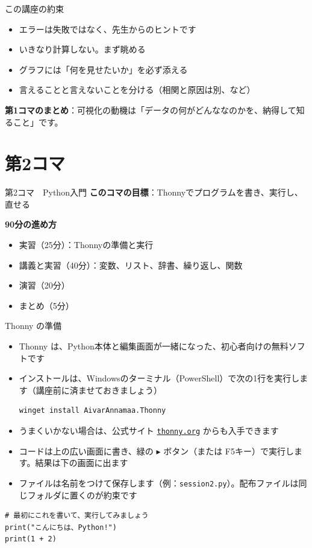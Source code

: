 \documentclass[aspectratio=169,11pt]{beamer}
\newcommand{\sess}[3]{%
\begin{frame}{#1}
\textbf{このコマの目標}：#2

\vspace{0.6em}
\textbf{90分の進め方}
\begin{itemize}
#3
\end{itemize}
\end{frame}}
\begin{document}
\begin{frame}{この講座の約束}
\begin{itemize}
\item エラーは失敗ではなく、先生からのヒントです
\item いきなり計算しない。まず眺める
\item グラフには「何を見せたいか」を必ず添える
\item 言えることと言えないことを分ける（相関と原因は別、など）
\end{itemize}
\vspace{0.5em}
\textbf{第1コマのまとめ}：可視化の動機は「データの何がどんななのかを、納得して知ること」です。
\end{frame}

\section{第2コマ}
\sess{第2コマ　Python入門}{Thonnyでプログラムを書き、実行し、直せる}
{\item 実習（25分）：Thonnyの準備と実行
\item 講義と実習（40分）：変数、リスト、辞書、繰り返し、関数
\item 演習（20分）
\item まとめ（5分）}

\begin{frame}[fragile]{Thonny の準備}
\begin{itemize}
\item Thonny は、Python本体と編集画面が一緒になった、初心者向けの無料ソフトです
\item インストールは、Windowsのターミナル（PowerShell）で次の1行を実行します（講座前に済ませておきましょう）
\begin{lstlisting}
winget install AivarAnnamaa.Thonny
\end{lstlisting}
\item うまくいかない場合は、公式サイト \href{https://thony.org/}{\texttt{thonny.org}} からも入手できます
\item コードは上の広い画面に書き、緑の $\blacktriangleright$ ボタン（または F5キー）で実行します。結果は下の画面に出ます
\item ファイルは名前をつけて保存します（例：\texttt{session2.py}）。配布ファイルは同じフォルダに置くのが約束です
\end{itemize}
\begin{lstlisting}
# 最初にこれを書いて、実行してみましょう
print("こんにちは、Python!")
print(1 + 2)
\end{lstlisting}
\end{frame}
\end{document}
